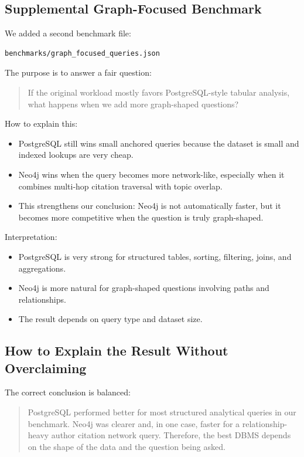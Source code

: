 \documentclass[11pt]{article}
\begin{document}
\subsection{Supplemental Graph-Focused Benchmark}

We added a second benchmark file:

\begin{verbatim}
benchmarks/graph_focused_queries.json
\end{verbatim}

The purpose is to answer a fair question:

\begin{quote}
If the original workload mostly favors PostgreSQL-style tabular analysis, what happens when we add more graph-shaped questions?
\end{quote}

How to explain this:

\begin{itemize}
    \item PostgreSQL still wins small anchored queries because the dataset is small and indexed lookups are very cheap.
    \item Neo4j wins when the query becomes more network-like, especially when it combines multi-hop citation traversal with topic overlap.
    \item This strengthens our conclusion: Neo4j is not automatically faster, but it becomes more competitive when the question is truly graph-shaped.
\end{itemize}

Interpretation:

\begin{itemize}
    \item PostgreSQL is very strong for structured tables, sorting, filtering, joins, and aggregations.
    \item Neo4j is more natural for graph-shaped questions involving paths and relationships.
    \item The result depends on query type and dataset size.
\end{itemize}

\subsection{How to Explain the Result Without Overclaiming}

The correct conclusion is balanced:

\begin{quote}
PostgreSQL performed better for most structured analytical queries in our benchmark.
Neo4j was clearer and, in one case, faster for a relationship-heavy author citation network query.
Therefore, the best DBMS depends on the shape of the data and the question being asked.
\end{quote}
\end{document}
